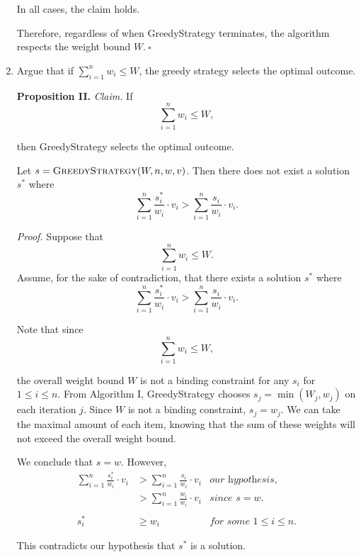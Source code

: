 \begin{enumerate}
\begin{solution}
In all cases, the claim holds.

Therefore, regardless of when {\sc GreedyStrategy} terminates, the algorithm respects the weight bound $W.~\square$
\end{solution}
\newpage
\item Argue that if $\sum_{i=1}^n w_i \leq W$, the greedy strategy selects the optimal outcome.
\begin{solution}
\textbf{Proposition II. }\textit{Claim. }If 
\[\sum_{i=1}^n{w_i}\leq W,\]

then {\sc GreedyStrategy} selects the optimal outcome.

Let $s=\textsc{GreedyStrategy}(W,n,w,v)$. Then there does not exist a solution $s^*$ where
\[\sum_{i=1}^n\frac{s_i^*}{w_i}\cdot v_i>\sum_{i=1}^n\frac{s_i}{w_i}\cdot v_i.\]

\textit{Proof. }Suppose that \[\sum_{i=1}^n{w_i}\leq W.\] Assume, for the sake of contradiction, that there exists a solution $s^*$ where
\[\sum_{i=1}^n\frac{s_i^*}{w_i}\cdot v_i>\sum_{i=1}^n\frac{s_i}{w_i}\cdot v_i.\]

Note that since \[\sum_{i=1}^n{w_i}\leq W,\]

the overall weight bound $W$ is not a binding constraint for any $s_i$ for $1\leq i\leq n$. From Algorithm I, {\sc GreedyStrategy} chooses $s_j=\min(W_j,w_j)$ on each iteration $j$. Since $W$ is not a binding constraint, $s_j=w_j$. We can take the maximal amount of each item, knowing that the sum of these weights will not exceed the overall weight bound.

We conclude that $s=w$. However,
\begin{align*}
\sum_{i=1}^n\frac{s_i^*}{w_i}\cdot v_i&>\sum_{i=1}^n\frac{s_i}{w_i}\cdot v_i&\textit{our hypothesis,}\\
&>\sum_{i=1}^n\frac{w_i}{w_i}\cdot v_i&\textit{since $s=w$.}\\\\
s_i^*&\geq w_i&\textit{for some $1\leq i\leq n$.}
\end{align*}

This contradicts our hypothesis that $s^*$ is a solution.


\end{solution}
\end{enumerate}
